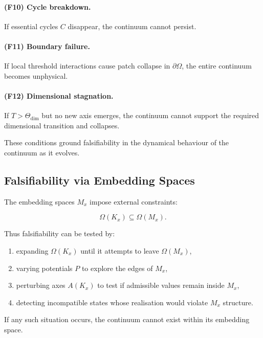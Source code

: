 \paragraph{(F10) Cycle breakdown.}
If essential cycles $C$ disappear, the continuum cannot persist.

\paragraph{(F11) Boundary failure.}
If local threshold interactions cause patch collapse in $\partial\Omega$,
the entire continuum becomes unphysical.

\paragraph{(F12) Dimensional stagnation.}
If $T > \Theta_{\mathrm{dim}}$ but no new axis emerges, the continuum
cannot support the required dimensional transition and collapses.

These conditions ground falsifiability in the dynamical behaviour of
the continuum as it evolves.



\subsection{Falsifiability via Embedding Spaces}

The embedding spaces $M_x$ impose external constraints:

\[
\Omega(K_x) \subseteq \Omega(M_x).
\]

Thus falsifiability can be tested by:

\begin{enumerate}
    \item expanding $\Omega(K_x)$ until it attempts to leave
          $\Omega(M_x)$,
    \item varying potentials $P$ to explore the edges of $M_x$,
    \item perturbing axes $A(K_x)$ to test if admissible values remain
          inside $M_x$,
    \item detecting incompatible states whose realisation would violate
          $M_x$ structure.
\end{enumerate}

If any such situation occurs, the continuum cannot exist within its
embedding space.



